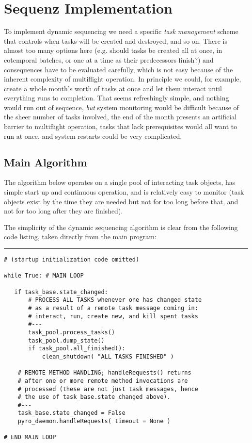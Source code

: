\documentclass[11pt,a4paper]{article}
\begin{document}
\section{Sequenz Implementation}

To implement dynamic sequencing we need a specific {\em task management}
scheme that controls when tasks will be created and destroyed, and so
on. There is almost too many options here (e.g. should tasks be
created all at once, in cotemporal batches, or one at a time as their
predecessors finish?) and consequences have to be evaluated carefully,
which is not easy because of the inherent complexity of multiflight
operation. In principle we could, for example, create a whole month's
worth of tasks at once and let them interact until everything runs to
completion. That seems refreshingly simple, and nothing would run out of
sequence, {\em but} system monitoring would be difficult because of the
sheer number of tasks involved, the end of the month presents an
artificial barrier to multiflight operation, tasks that lack
prerequisites would all want to run at once, and system restarts could
be very complicated. 

\subsection{Main Algorithm}

The algorithm below operates on a single pool of interacting task
objects, has simple start up and continuous operation, and is relatively
easy to monitor (task objects exist by the time they are needed but not
for too long before that, and not for too long after they are finished). 

The simplicity of the dynamic sequencing algorithm is clear from the
following code listing, taken directly from the main program:

{\small
\noindent
\rule{5cm}{.2mm}
\begin{lstlisting}
# (startup initialization code omitted)

while True: # MAIN LOOP

   if task_base.state_changed:
       # PROCESS ALL TASKS whenever one has changed state
       # as a result of a remote task message coming in: 
       # interact, run, create new, and kill spent tasks
       #---
       task_pool.process_tasks()
       task_pool.dump_state()
       if task_pool.all_finished():
           clean_shutdown( "ALL TASKS FINISHED" )

    # REMOTE METHOD HANDLING; handleRequests() returns 
    # after one or more remote method invocations are 
    # processed (these are not just task messages, hence 
    # the use of task_base.state_changed above).
    #---
    task_base.state_changed = False
    pyro_daemon.handleRequests( timeout = None )

# END MAIN LOOP
\end{lstlisting}
}
\end{document}
